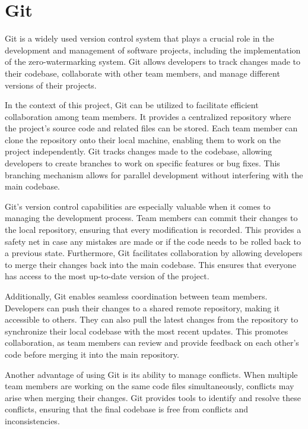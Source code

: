 \documentclass[12pt]{report}
\begin{document}
\section{Git}
Git is a widely used version control system that plays a crucial role in the development and management of software projects, including the implementation of the zero-watermarking system. Git allows developers to track changes made to their codebase, collaborate with other team members, and manage different versions of their projects.
\newline

In the context of this project, Git can be utilized to facilitate efficient collaboration among team members. It provides a centralized repository where the project's source code and related files can be stored. Each team member can clone the repository onto their local machine, enabling them to work on the project independently. Git tracks changes made to the codebase, allowing developers to create branches to work on specific features or bug fixes. This branching mechanism allows for parallel development without interfering with the main codebase.
\newline

Git's version control capabilities are especially valuable when it comes to managing the development process. Team members can commit their changes to the local repository, ensuring that every modification is recorded. This provides a safety net in case any mistakes are made or if the code needs to be rolled back to a previous state. Furthermore, Git facilitates collaboration by allowing developers to merge their changes back into the main codebase. This ensures that everyone has access to the most up-to-date version of the project.
\newline

Additionally, Git enables seamless coordination between team members. Developers can push their changes to a shared remote repository, making it accessible to others. They can also pull the latest changes from the repository to synchronize their local codebase with the most recent updates. This promotes collaboration, as team members can review and provide feedback on each other's code before merging it into the main repository.
\newline

Another advantage of using Git is its ability to manage conflicts. When multiple team members are working on the same code files simultaneously, conflicts may arise when merging their changes. Git provides tools to identify and resolve these conflicts, ensuring that the final codebase is free from conflicts and inconsistencies.
\newline
\end{document}
